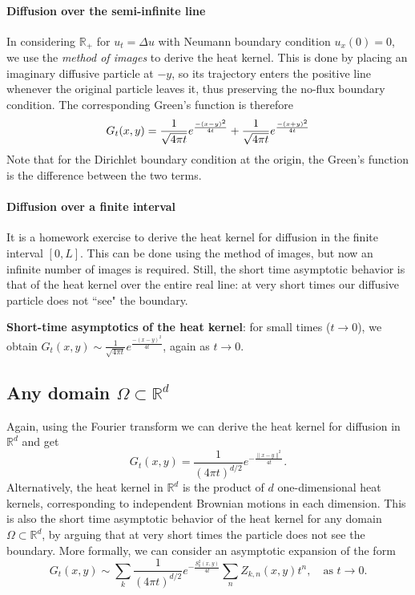 \paragraph{Diffusion over the semi-infinite line}

In considering $\mathbb{R}_+$ for $u_t=\Delta u$ with Neumann boundary condition $u_x(0)=0$, we use the {\em{method of images}} to derive the heat kernel. This is done by placing an imaginary diffusive particle at $-y$, so its trajectory enters the positive line whenever the original particle leaves it, thus preserving the no-flux boundary condition. The corresponding Green's function is therefore
\begin{equation*}
G_t(x,y)=\frac{1}{\sqrt{4\pi t}}e^{\frac{-(x-y)^2}{4t}}+\frac{1}{\sqrt{4\pi t}}e^{\frac{-(x+y)^2}{4t}}\\
\end{equation*}
Note that for the Dirichlet boundary condition at the origin, the Green's function is the difference between the two terms.

\paragraph{Diffusion over a finite interval}
It is a homework exercise to derive the heat kernel for diffusion in the finite interval $[0,L]$. This can be done using the method of images, but now an infinite number of images is required. Still, the short time asymptotic behavior is that of the heat kernel over the entire real line: at very short times our diffusive particle does not ``see" the boundary.

{\textbf{Short-time asymptotics of the heat kernel}}: for small times ($t\rightarrow 0$), we obtain $G_t(x,y)\sim\frac{1}{\sqrt{4\pi t}} e^{\frac{-(x-y)^2}{4t}}$, again as $t\rightarrow0$.

\subsection{Any domain $\Omega\subset\mathbb{R}^d$}
Again, using the Fourier transform we can derive the heat kernel for diffusion in $\mathbb{R}^d$ and get
\begin{equation*}
G_t(x,y) = \frac{1}{(4\pi t)^{d/2}} e^{-\frac{\|x-y\|^2}{4t}}.
\end{equation*}
Alternatively, the heat kernel in $\mathbb{R}^d$ is the product of $d$ one-dimensional heat kernels, corresponding to independent Brownian motions in each dimension.
This is also the short time asymptotic behavior of the heat kernel for any domain $\Omega \subset \mathbb{R}^d$, by arguing that at very short times the particle does not see the boundary.
More formally, we can consider an asymptotic expansion of the form
\begin{equation*}
G_t(x,y)\sim\sum\limits_k \frac{1}{(4\pi t)^{d/2}}e^{-\frac{S_k^2(x,y)}{4t}}\sum_n Z_{k,n}(x,y)t^n,\quad \text{as } t\to 0.
\end{equation*}

